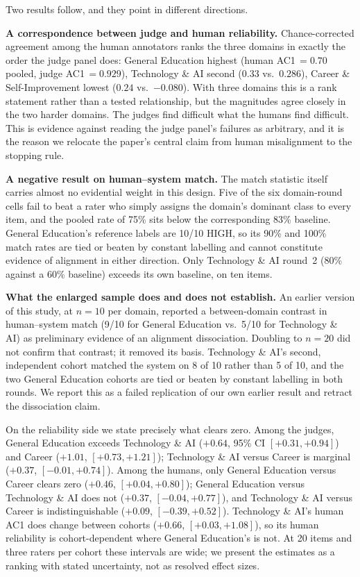 \documentclass[11pt]{article}
\begin{document}
Two results follow, and they point in different directions.

\textbf{A correspondence between judge and human reliability.}
Chance-corrected agreement among the human annotators ranks the three
domains in exactly the order the judge panel does: General Education
highest (human AC1\,$=0.70$ pooled, judge AC1\,$=0.929$), Technology \& AI
second ($0.33$ vs.\ $0.286$), Career \& Self-Improvement lowest ($0.24$
vs.\ $-0.080$). With three domains this is a rank statement rather than a
tested relationship, but the magnitudes agree closely in the two harder
domains. The judges find difficult what the humans find difficult. This is
evidence against reading the judge panel's failures as arbitrary, and it
is the reason we relocate the paper's central claim from human
misalignment to the stopping rule.

\textbf{A negative result on human--system match.} The match statistic
itself carries almost no evidential weight in this design. Five of the six
domain-round cells fail to beat a rater who simply assigns the domain's
dominant class to every item, and the pooled rate of 75\% sits below the
corresponding 83\% baseline. General Education's reference labels are
10/10 HIGH, so its 90\% and 100\% match rates are tied or beaten by
constant labelling and cannot constitute evidence of alignment in either
direction. Only Technology \& AI round~2 (80\% against a 60\% baseline)
exceeds its own baseline, on ten items.

\textbf{What the enlarged sample does and does not establish.} An earlier
version of this study, at $n=10$ per domain, reported a between-domain
contrast in human--system match (9/10 for General Education vs.\ 5/10 for
Technology \& AI) as preliminary evidence of an alignment dissociation.
Doubling to $n=20$ did not confirm that contrast; it removed its basis.
Technology \& AI's second, independent cohort matched the system on 8 of
10 rather than 5 of 10, and the two General Education cohorts are tied or
beaten by constant labelling in both rounds. We report this as a failed
replication of our own earlier result and retract the dissociation claim.

On the reliability side we state precisely what clears zero. Among the
judges, General Education exceeds Technology \& AI ($+0.64$,
95\% CI $[+0.31, +0.94]$) and Career ($+1.01$, $[+0.73, +1.21]$); Technology
\& AI versus Career is marginal ($+0.37$, $[-0.01, +0.74]$). Among the
humans, only General Education versus Career clears zero ($+0.46$,
$[+0.04, +0.80]$); General Education versus Technology \& AI does not
($+0.37$, $[-0.04, +0.77]$), and Technology \& AI versus Career is
indistinguishable ($+0.09$, $[-0.39, +0.52]$). Technology \& AI's human
AC1 does change between cohorts ($+0.66$, $[+0.03, +1.08]$), so its human
reliability is cohort-dependent where General Education's is not. At 20
items and three raters per cohort these intervals are wide; we present the
estimates as a ranking with stated uncertainty, not as resolved effect
sizes.
\end{document}
